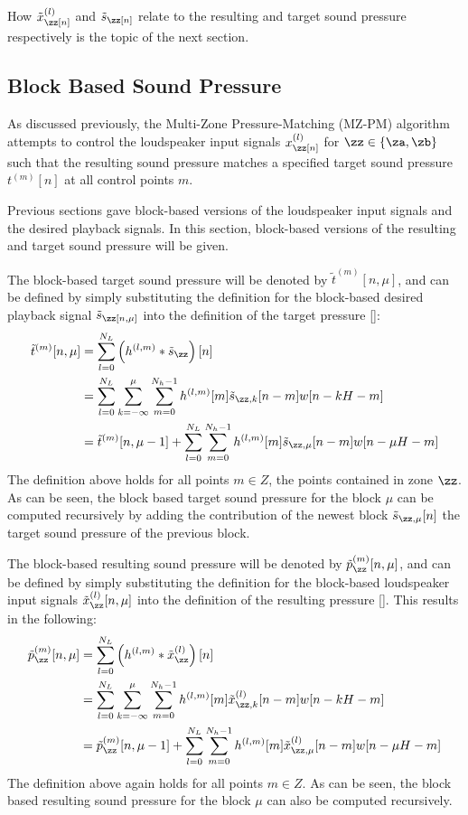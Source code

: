 How $\tilde{x}^{(l)}_\zz[n]$ and $\tilde{s}_\zz[n]$ relate to the resulting and target sound pressure respectively
is the topic of the next section.

\subsection{Block Based Sound Pressure}
As discussed previously, the Multi-Zone Pressure-Matching (MZ-PM) algorithm attempts to 
control the loudspeaker input signals 
$x^{(l)}_\zz[n]$ for $\zz\in\left\{\za,\zb\right\}$ such that the resulting sound pressure matches a 
specified target sound pressure $t^{(m)}[n]$ at all control points $m$.

Previous sections gave block-based versions of the loudspeaker input signals and the desired playback signals.
In this section, block-based versions of the resulting and target sound pressure will be given. 

The block-based target sound pressure will be denoted by $\tilde{t}^{(m)}[n, \mu]$, and can be defined by simply 
substituting the definition for the block-based desired playback signal $\tilde{s}_\zz[n, \mu]$ into the definition of the target pressure \autoref{}:
\begin{align}
    \tilde{t}^{(m)}[n, \mu] &= \sum_{l=0}^{N_L} \left(h^{(l,m)} \ast \tilde{s}_\zz\right)[n]\\
                       &= \sum_{l=0}^{N_L}\sum_{k=-\infty}^{\mu}\sum_{m=0}^{N_h - 1}h^{(l,m)}[m]\tilde{s}_{\zz,k}[n - m]w[n - kH - m] \\
                       &= \tilde{t}^{(m)}[n, \mu - 1] + \sum_{l=0}^{N_L}\sum_{m=0}^{N_h - 1}h^{(l,m)}[m]\tilde{s}_{\zz,\mu}[n - m]w[n - \mu H - m] 
\end{align}
The definition above holds for all points $m\in Z$, the points contained in zone $\zz$.  
As can be seen, the block based target sound pressure for the block $\mu$ can be computed recursively by adding the contribution of the newest block 
$\tilde{s}_{\zz,\mu}[n]$ the target sound pressure of the previous block.

The block-based resulting sound pressure will be denoted by $\tilde{p}_\zz^{(m)}[n, \mu]$, and can be defined by simply 
substituting the definition for the block-based loudspeaker input signals $\tilde{x}_\zz^{(l)}[n, \mu]$ into the definition of the resulting pressure \autoref{}.
This results in the following: 
\begin{align}
    \tilde{p}_\zz^{(m)}[n, \mu] &= \sum_{l=0}^{N_L} \left(h^{(l,m)} \ast \tilde{x}^{(l)}_\zz\right)[n]\\
                       &= \sum_{l=0}^{N_L}\sum_{k=-\infty}^{\mu}\sum_{m=0}^{N_h - 1}h^{(l,m)}[m]\tilde{x}^{(l)}_{\zz,k}[n - m]w[n - kH - m] \\
                       &= \tilde{p}_\zz^{(m)}[n, \mu - 1] + \sum_{l=0}^{N_L}\sum_{m=0}^{N_h - 1}h^{(l,m)}[m]\tilde{x}^{(l)}_{\zz,\mu}[n - m]w[n - \mu H - m]  
\end{align}
The definition above again holds for all points $m\in Z$.  
As can be seen, the block based resulting sound pressure for the block $\mu$ can also be computed recursively.

